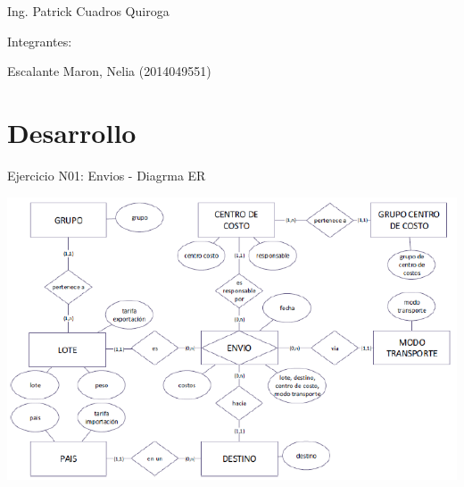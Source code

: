 \documentclass[12pt,letterpaper]{article}
\begin{document}
\begin{titlepage}
\begin{center}
\vspace*{0.1in}
\begin{large}
 Ing. Patrick Cuadros Quiroga\\
\end{large}

\vspace*{0.2in}
\vspace*{0.1in}
\begin{large}
Integrantes: \\
\begin{flushleft}
Escalante Maron, Nelia 		\hfill	(2014049551) \\

\end{flushleft}
\end{large}
\end{center}

\end{titlepage}


 \tableofcontents
 \newpage

 
\section{Desarrollo} 

Ejercicio N01:  Envios - Diagrma ER

\begin{center}
\includegraphics[width=17cm]{IMG/er1.png} 
\end{center}
\end{document}
